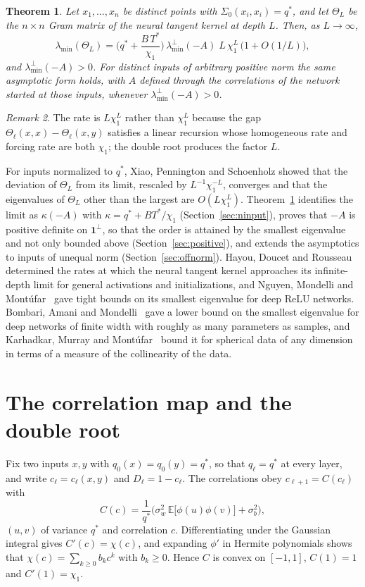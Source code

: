 \documentclass[11pt]{amsart}
\newtheorem{theorem}{Theorem}[section]
\theoremstyle{remark}\newtheorem{remark}[theorem]{Remark}
\newcommand{\E}{\mathbb{E}}
\begin{document}
\begin{theorem}\label{thm:main}
Let $x_1,\dots,x_n$ be distinct points with $\Sigma_0(x_i,x_i)=q^*$, and let $\Theta_L$ be the $n\times n$ Gram matrix
of the neural tangent kernel at depth $L$. Then, as $L\to\infty$,
\[
\lambda_{\min}(\Theta_L)=\Big(q^*+\frac{B\,T^*}{\chi_1}\Big)\,\lambda_{\min}^\perp(-A)\;L\,\chi_1^{L}\,\big(1+O(1/L)\big),
\]
and $\lambda_{\min}^\perp(-A)>0$. For distinct inputs of arbitrary positive norm the same asymptotic form holds, with
$A$ defined through the correlations of the network started at those inputs, whenever $\lambda_{\min}^\perp(-A)>0$.
\end{theorem}

\begin{remark}
The rate is $L\chi_1^L$ rather than $\chi_1^L$ because the gap $\Theta_\ell(x,x)-\Theta_\ell(x,y)$ satisfies a linear
recursion whose homogeneous rate and forcing rate are both $\chi_1$; the double root produces the factor $L$.
\end{remark}

For inputs normalized to $q^*$, Xiao, Pennington and Schoenholz \cite{xps} showed that the deviation of $\Theta_L$ from its limit,
rescaled by $L^{-1}\chi_1^{-L}$, converges and that the eigenvalues of $\Theta_L$ other than the largest are
$O(L\chi_1^L)$. Theorem~\ref{thm:main} identifies the limit as $\kappa(-A)$ with $\kappa=q^*+BT^*/\chi_1$
(Section~\ref{sec:ninput}), proves that $-A$ is positive definite on $\mathbf 1^\perp$, so that the order is attained by
the smallest eigenvalue and not only bounded above (Section~\ref{sec:positive}), and extends the asymptotics to inputs of
unequal norm (Section~\ref{sec:offnorm}). Hayou, Doucet and Rousseau~\cite{hdr} determined the rates at which the
neural tangent kernel approaches its infinite-depth limit for general activations and initializations, and Nguyen,
Mondelli and Mont\'ufar~\cite{nmm} gave tight bounds on its smallest eigenvalue for deep ReLU networks. Bombari,
Amani and Mondelli~\cite{bam} gave a lower bound on the smallest eigenvalue for deep networks of finite width with
roughly as many parameters as samples, and Karhadkar, Murray and Mont\'ufar~\cite{kmm} bound it for spherical data of
any dimension in terms of a measure of the collinearity of the data.

\section{The correlation map and the double root}\label{sec:double}
Fix two inputs $x,y$ with $q_0(x)=q_0(y)=q^*$, so that $q_\ell=q^*$ at every layer, and write $c_\ell=c_\ell(x,y)$ and
$D_\ell=1-c_\ell$. The correlations obey $c_{\ell+1}=C(c_\ell)$ with
\[
C(c)=\frac{1}{q^*}\Big(\sigma_w^2\,\E\big[\phi(u)\phi(v)\big]+\sigma_b^2\Big),
\]
$(u,v)$ of variance $q^*$ and correlation $c$. Differentiating under the Gaussian integral gives $C'(c)=\chi(c)$, and
expanding $\phi'$ in Hermite polynomials shows that $\chi(c)=\sum_{k\ge0}b_kc^k$ with $b_k\ge0$. Hence $C$ is convex on
$[-1,1]$, $C(1)=1$ and $C'(1)=\chi_1$.
\end{document}
